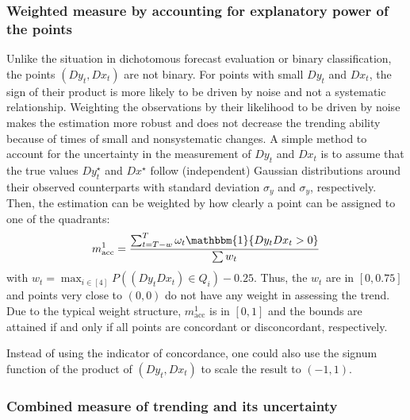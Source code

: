 \documentclass[oneside]{article}
\theoremstyle{plain}%
\theoremstyle{definition}
\newcommand{\ind}[1]{\mathbbm{1}\{#1\}}
\newcommand{\ydiff}{D y}
\newcommand{\ydifft}{Dy^\star}
\newcommand{\xdiff}{Dx}
\newcommand{\xdifft}{Dx^\star}
\begin{document}
\subsubsection{Weighted measure by accounting for explanatory power of the points}\label{subsec:w1}

Unlike the situation in dichotomous forecast evaluation or binary classification, the points $(\ydiff_t, \xdiff_t)$ are not binary.
For points with small $\ydiff_t$ and $\xdiff_t$, the sign of their product is more likely to be driven by noise and not a systematic relationship.
Weighting the observations by their likelihood to be driven by noise makes the estimation more robust and does not decrease the trending ability because of times of small and nonsystematic changes. 
A simple method to account for the uncertainty in the measurement of $\ydiff_t$ and $\xdiff_t$ is to assume that the true values $\ydifft_t$ and $\xdifft$ follow (independent) Gaussian distributions around their observed counterparts with standard deviation $\sigma_y$ and $\sigma_y$, respectively.
Then, the estimation can be weighted by how clearly a point can be assigned to one of the quadrants:
\begin{equation}
    m_{\text{acc}}^1 = \frac{\sum_{t=T-w}^T \omega_t \ind{\ydiff_t \xdiff_t > 0} }{\sum w_t}
\end{equation}
with $w_t = \max_{i \in [4]} P((\ydiff_t \xdiff_t) \in Q_i) - 0.25$.
Thus, the $w_t$ are in $[0, 0.75]$ and points very close to $(0, 0)$ do not have any weight in assessing the trend. 
Due to the typical weight structure, $m_{\text{acc}}^1$ is in $[0,1]$ and the bounds are attained if and only if all points are concordant or disconcordant, respectively.

Instead of using the indicator of concordance, one could also use the signum function of the product of $(\ydiff_t, \xdiff_t)$ to scale the result to $(-1, 1)$.

\subsubsection{Combined measure of trending and its uncertainty} \label{subsec:w2}
\end{document}
